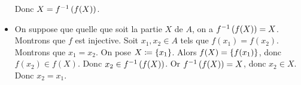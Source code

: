 \documentclass{magnolia}
\begin{document}
\begin{sol}
\begin{questions}
\begin{itemize}
\begin{itemize}
  \end{itemize}
  Donc $X= f^{-1}\left(f(X)\right)$.
\item On suppose que quelle que soit la partie $X$ de $A$, on a $f^{-1}\left(f(X)\right)=X$. Montrons que $f$ est injective. Soit $x_1,x_2\in A$ tels que $f(x_1)=f(x_2)$. Montrons que $x_1=x_2$. On pose $X\coloneqq\left\{x_1\right\}$. Alors $f(X)=\left\{f(x_1)\right\}$, donc $f(x_2)\in f(X)$. Donc $x_2\in f^{-1}\left(f(X)\right)$. Or $f^{-1}\left(f(X)\right)=X$, donc $x_2\in X$. Donc $x_2=x_1$.
  \end{itemize}
\end{questions}
\end{sol}


\end{document}
